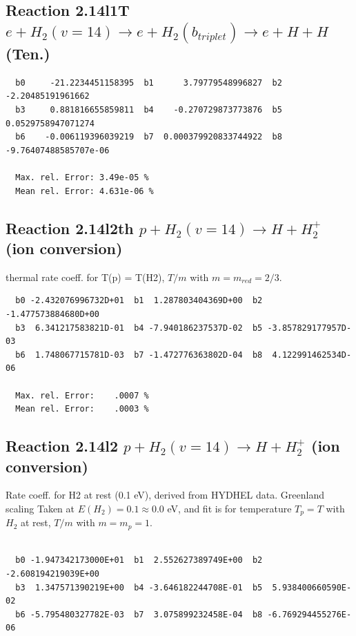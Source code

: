 \documentclass[12pt,dvipdfmx]{article}
\begin{document}
\subsection{
Reaction 2.14l1T
$ e +  H_2(v=14) \rightarrow e + H_2(b_{triplet}) \rightarrow e + H + H $ (Ten.)
}


\begin{small}\begin{verbatim}
  b0     -21.2234451158395  b1      3.79779548996827  b2     -2.20485191961662
  b3     0.881816655859811  b4    -0.270729873773876  b5    0.0529758947071274
  b6    -0.006119396039219  b7  0.000379920833744922  b8 -9.76407488585707e-06

  Max. rel. Error: 3.49e-05 %
  Mean rel. Error: 4.631e-06 %
\end{verbatim}\end{small}


\subsection{
Reaction 2.14l2th
$ p + H_2(v=14) \rightarrow H + H_2^+$ (ion conversion)
}
thermal rate coeff. for T(p) = T(H2),
$T/m$ with $m=m_{red}=2/3$.

\begin{small}\begin{verbatim}
  b0 -2.432076996732D+01  b1  1.287803404369D+00  b2 -1.477573884680D+00
  b3  6.341217583821D-01  b4 -7.940186237537D-02  b5 -3.857829177957D-03
  b6  1.748067715781D-03  b7 -1.472776363802D-04  b8  4.122991462534D-06

  Max. rel. Error:    .0007 %
  Mean rel. Error:    .0003 %
\end{verbatim}\end{small}

\subsection{
Reaction 2.14l2
$ p + H_2(v=14) \rightarrow H + H_2^+$ (ion conversion)
}
Rate coeff. for H2 at rest (0.1 eV), derived from HYDHEL data. Greenland scaling
Taken at $E(H_2) = 0.1 \approx 0.0$ eV,  and fit is for temperature $T_p=T$ with $H_2$ at rest,
$T/m$ with $m=m_p=1$.

\begin{small}\begin{verbatim}

  b0 -1.947342173000E+01  b1  2.552627389749E+00  b2 -2.608194219039E+00
  b3  1.347571390219E+00  b4 -3.646182244708E-01  b5  5.938400660590E-02
  b6 -5.795480327782E-03  b7  3.075899232458E-04  b8 -6.769294455276E-06

\end{verbatim}\end{small}
\end{document}
